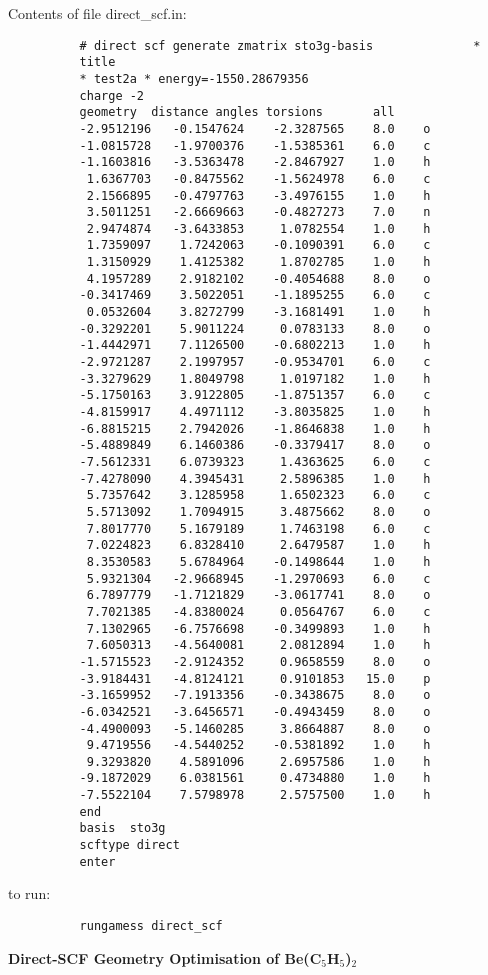 \documentclass[11pt,fleqn]{article}
\begin{document}
Contents of file direct\_scf.in:
{
\footnotesize
\begin{verbatim}
          # direct scf generate zmatrix sto3g-basis              *
          title
          * test2a * energy=-1550.28679356
          charge -2
          geometry  distance angles torsions       all
          -2.9512196   -0.1547624    -2.3287565    8.0    o
          -1.0815728   -1.9700376    -1.5385361    6.0    c
          -1.1603816   -3.5363478    -2.8467927    1.0    h
           1.6367703   -0.8475562    -1.5624978    6.0    c
           2.1566895   -0.4797763    -3.4976155    1.0    h
           3.5011251   -2.6669663    -0.4827273    7.0    n
           2.9474874   -3.6433853     1.0782554    1.0    h
           1.7359097    1.7242063    -0.1090391    6.0    c
           1.3150929    1.4125382     1.8702785    1.0    h
           4.1957289    2.9182102    -0.4054688    8.0    o
          -0.3417469    3.5022051    -1.1895255    6.0    c
           0.0532604    3.8272799    -3.1681491    1.0    h
          -0.3292201    5.9011224     0.0783133    8.0    o
          -1.4442971    7.1126500    -0.6802213    1.0    h
          -2.9721287    2.1997957    -0.9534701    6.0    c
          -3.3279629    1.8049798     1.0197182    1.0    h
          -5.1750163    3.9122805    -1.8751357    6.0    c
          -4.8159917    4.4971112    -3.8035825    1.0    h
          -6.8815215    2.7942026    -1.8646838    1.0    h
          -5.4889849    6.1460386    -0.3379417    8.0    o
          -7.5612331    6.0739323     1.4363625    6.0    c
          -7.4278090    4.3945431     2.5896385    1.0    h
           5.7357642    3.1285958     1.6502323    6.0    c
           5.5713092    1.7094915     3.4875662    8.0    o
           7.8017770    5.1679189     1.7463198    6.0    c
           7.0224823    6.8328410     2.6479587    1.0    h
           8.3530583    5.6784964    -0.1498644    1.0    h
           5.9321304   -2.9668945    -1.2970693    6.0    c
           6.7897779   -1.7121829    -3.0617741    8.0    o
           7.7021385   -4.8380024     0.0564767    6.0    c
           7.1302965   -6.7576698    -0.3499893    1.0    h
           7.6050313   -4.5640081     2.0812894    1.0    h
          -1.5715523   -2.9124352     0.9658559    8.0    o
          -3.9184431   -4.8124121     0.9101853   15.0    p
          -3.1659952   -7.1913356    -0.3438675    8.0    o
          -6.0342521   -3.6456571    -0.4943459    8.0    o
          -4.4900093   -5.1460285     3.8664887    8.0    o
           9.4719556   -4.5440252    -0.5381892    1.0    h
           9.3293820    4.5891096     2.6957586    1.0    h
          -9.1872029    6.0381561     0.4734880    1.0    h
          -7.5522104    7.5798978     2.5757500    1.0    h
          end
          basis  sto3g
          scftype direct
          enter
\end{verbatim}
}
to run:
{
\footnotesize
\begin{verbatim}
          rungamess direct_scf
\end{verbatim}
}
{\bf Direct-SCF Geometry Optimisation of Be(C$_{5}$H$_{5}$)$_{2}$}\\
\end{document}

